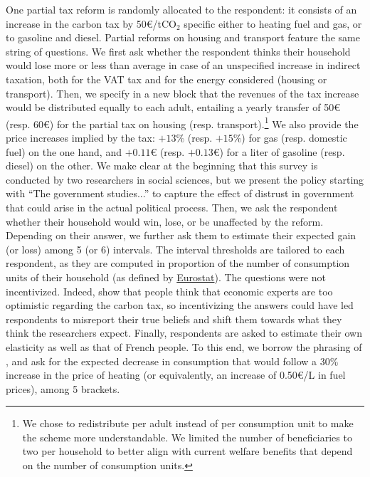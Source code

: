 \documentclass[12pt]{article} %
\begin{document}
One partial tax reform is randomly allocated to the respondent: it consists of an increase in the carbon tax by 50\euro{}/t$\text{CO}_{2}$ specific either to heating fuel and gas, or to gasoline and diesel. Partial reforms on housing and transport feature the same string of questions. We first ask whether the respondent thinks their household would lose more or less than average in case of an unspecified increase in indirect taxation, both for the VAT tax and for the energy considered (housing or transport). Then, we specify in a new block that the revenues of the tax increase would be distributed equally to each adult, entailing a yearly transfer of 50\euro{} (resp. 60\euro{}) for the partial tax on housing (resp. transport).\footnote{We chose to redistribute per adult instead of per consumption unit to make the scheme more understandable. We limited the number of beneficiaries to two per household to better align with current welfare benefits that depend on the number of consumption units.} We also provide the price increases implied by the tax: $+13\%$ (resp. $+15\%$) for gas (resp. domestic fuel) on the one hand, and $+0.11$\euro{} (resp. $+0.13$\euro{}) for a liter of gasoline (resp. diesel) on the other. We make clear at the beginning that this survey is conducted by two researchers in social sciences, but we present the policy starting with ``The government studies...'' to capture the effect of distrust in government that could arise in the actual political process. Then, we ask the respondent whether their household would win, lose, or be unaffected by the reform. Depending on their answer, we further ask them to estimate their expected gain (or loss) among 5 (or 6) intervals. The interval thresholds are tailored to each respondent, as they are computed in proportion of the number of consumption units of their household (as defined by \href{http://ec.europa.eu/eurostat/statistics-explained/index.php/Glossary:Equivalised_disposable_income}{Eurostat}). The questions were not incentivized. Indeed, \citet{sapienza_zingales_2013} show that people think that economic experts are too optimistic regarding the carbon tax, so incentivizing the answers could have led respondents to misreport their true beliefs and shift them towards what they think the researchers expect. Finally, respondents are asked to estimate their own elasticity as well as that of French people. To this end, we borrow the phrasing of \citet{baranzini_effectiveness_2017}, and ask for the expected decrease in consumption that would follow a 30\% increase in the price of heating (or equivalently, an increase of 0.50\euro{}/L in fuel prices), among 5 brackets.
\end{document}
